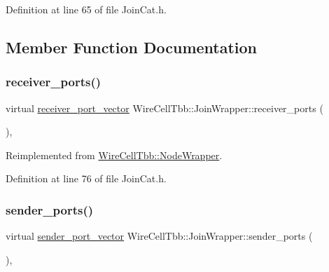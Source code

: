 Definition at line 65 of file Join\+Cat.\+h.



\subsection{Member Function Documentation}
\mbox{\label{class_wire_cell_tbb_1_1_join_wrapper_ac6d333cda577fcf066561dd48f134440}} 
\subsubsection{\texorpdfstring{receiver\+\_\+ports()}{receiver\_ports()}}
{\footnotesize\ttfamily virtual \hyperlink{namespace_wire_cell_tbb_a87f42fe8a3ccc3bf9d315cb2d252c7af}{receiver\+\_\+port\+\_\+vector} Wire\+Cell\+Tbb\+::\+Join\+Wrapper\+::receiver\+\_\+ports (\begin{DoxyParamCaption}{ }\end{DoxyParamCaption})\hspace{0.3cm}{\ttfamily [inline]}, {\ttfamily [virtual]}}



Reimplemented from \hyperlink{class_wire_cell_tbb_1_1_node_wrapper_ac3c636904e4d3d1df0939906dd8853c7}{Wire\+Cell\+Tbb\+::\+Node\+Wrapper}.



Definition at line 76 of file Join\+Cat.\+h.

\mbox{\label{class_wire_cell_tbb_1_1_join_wrapper_a5f533ec15abe6bbc05b852af154cb9a1}} 
\subsubsection{\texorpdfstring{sender\+\_\+ports()}{sender\_ports()}}
{\footnotesize\ttfamily virtual \hyperlink{namespace_wire_cell_tbb_a99272fef0f0c33dc9d4e6e8f777b2e6e}{sender\+\_\+port\+\_\+vector} Wire\+Cell\+Tbb\+::\+Join\+Wrapper\+::sender\+\_\+ports (\begin{DoxyParamCaption}{ }\end{DoxyParamCaption})\hspace{0.3cm}{\ttfamily [inline]}, {\ttfamily [virtual]}}




